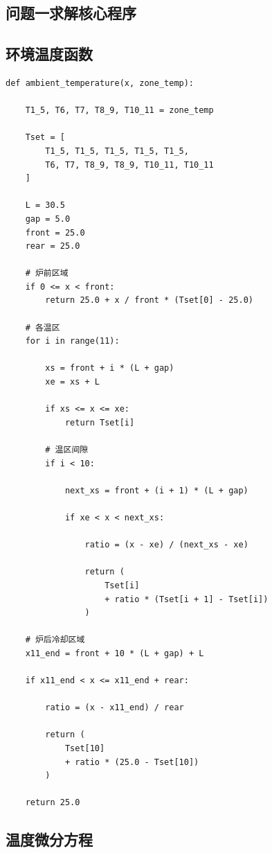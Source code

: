 \documentclass{cumcmthesis}
\begin{document}
\begin{appendices}

\section{问题一求解核心程序}

\subsection{环境温度函数}

\begin{verbatim}
def ambient_temperature(x, zone_temp):

    T1_5, T6, T7, T8_9, T10_11 = zone_temp

    Tset = [
        T1_5, T1_5, T1_5, T1_5, T1_5,
        T6, T7, T8_9, T8_9, T10_11, T10_11
    ]

    L = 30.5
    gap = 5.0
    front = 25.0
    rear = 25.0

    # 炉前区域
    if 0 <= x < front:
        return 25.0 + x / front * (Tset[0] - 25.0)

    # 各温区
    for i in range(11):

        xs = front + i * (L + gap)
        xe = xs + L

        if xs <= x <= xe:
            return Tset[i]

        # 温区间隙
        if i < 10:

            next_xs = front + (i + 1) * (L + gap)

            if xe < x < next_xs:

                ratio = (x - xe) / (next_xs - xe)

                return (
                    Tset[i]
                    + ratio * (Tset[i + 1] - Tset[i])
                )

    # 炉后冷却区域
    x11_end = front + 10 * (L + gap) + L

    if x11_end < x <= x11_end + rear:

        ratio = (x - x11_end) / rear

        return (
            Tset[10]
            + ratio * (25.0 - Tset[10])
        )

    return 25.0
\end{verbatim}


\subsection{温度微分方程}


\end{appendices}
\end{document}

